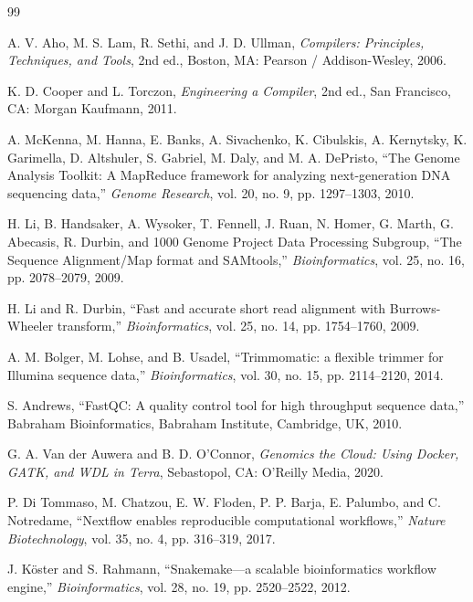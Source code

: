 \documentclass[12pt,a4paper]{article}
\begin{document}
\begin{thebibliography}{99}

A. V. Aho, M. S. Lam, R. Sethi, and J. D. Ullman,
\textit{Compilers: Principles, Techniques, and Tools},
2nd ed., Boston, MA: Pearson / Addison-Wesley, 2006.

K. D. Cooper and L. Torczon,
\textit{Engineering a Compiler},
2nd ed., San Francisco, CA: Morgan Kaufmann, 2011.

A. McKenna, M. Hanna, E. Banks, A. Sivachenko, K. Cibulskis, A. Kernytsky, K. Garimella, D. Altshuler, S. Gabriel, M. Daly, and M. A. DePristo,
``The Genome Analysis Toolkit: A MapReduce framework for analyzing next-generation DNA sequencing data,''
\textit{Genome Research}, vol. 20, no. 9, pp. 1297--1303, 2010.

H. Li, B. Handsaker, A. Wysoker, T. Fennell, J. Ruan, N. Homer, G. Marth, G. Abecasis, R. Durbin, and 1000 Genome Project Data Processing Subgroup,
``The Sequence Alignment/Map format and SAMtools,''
\textit{Bioinformatics}, vol. 25, no. 16, pp. 2078--2079, 2009.

H. Li and R. Durbin,
``Fast and accurate short read alignment with Burrows-Wheeler transform,''
\textit{Bioinformatics}, vol. 25, no. 14, pp. 1754--1760, 2009.

A. M. Bolger, M. Lohse, and B. Usadel,
``Trimmomatic: a flexible trimmer for Illumina sequence data,''
\textit{Bioinformatics}, vol. 30, no. 15, pp. 2114--2120, 2014.

S. Andrews,
``FastQC: A quality control tool for high throughput sequence data,''
Babraham Bioinformatics, Babraham Institute, Cambridge, UK, 2010.

G. A. Van der Auwera and B. D. O'Connor,
\textit{Genomics the Cloud: Using Docker, GATK, and WDL in Terra},
Sebastopol, CA: O'Reilly Media, 2020.

P. Di Tommaso, M. Chatzou, E. W. Floden, P. P. Barja, E. Palumbo, and C. Notredame,
``Nextflow enables reproducible computational workflows,''
\textit{Nature Biotechnology}, vol. 35, no. 4, pp. 316--319, 2017.

J. K{\"o}ster and S. Rahmann,
``Snakemake---a scalable bioinformatics workflow engine,''
\textit{Bioinformatics}, vol. 28, no. 19, pp. 2520--2522, 2012.


\end{thebibliography}
\end{document}
